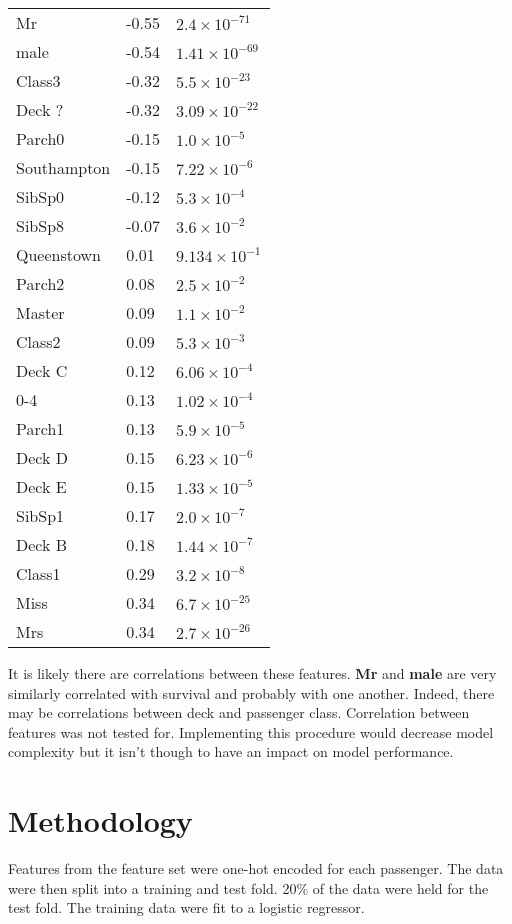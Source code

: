 \documentclass[10pt]{article}
\begin{document}
\begin{multicols}{2}
\begin{tabular}{l l l}
		Mr & -0.55 & $2.4\times10^{-71}$ \\
		male & -0.54 & $1.41\times10^{-69}$ \\
		Class3 & -0.32 & $5.5\times10^{-23}$ \\
		Deck ? & -0.32 & $3.09\times10^{-22}$ \\
		Parch0 & -0.15 & $1.0\times10^{-5}$ \\
		Southampton & -0.15 & $7.22\times10^{-6}$ \\
		SibSp0 & -0.12 & $5.3\times10^{-4}$ \\
		SibSp8 & -0.07 & $3.6\times10^{-2}$ \\
		Queenstown & 0.01 & $9.134\times10^{-1}$ \\
		Parch2 & 0.08 & $2.5\times10^{-2}$ \\
		Master & 0.09 & $1.1\times10^{-2}$ \\
		Class2 & 0.09 & $5.3\times10^{-3}$ \\
		Deck C & 0.12  & $6.06\times10^{-4}$ \\
		0-4 & 0.13 & $1.02\times10^{-4}$ \\
		Parch1 & 0.13 & $5.9\times10^{-5}$ \\
		Deck D & 0.15 & $6.23\times10^{-6}$ \\
		Deck E & 0.15 & $1.33\times10^{-5}$ \\
		SibSp1 & 0.17 & $2.0\times10^{-7}$ \\
		Deck B & 0.18 & $1.44\times10^{-7}$ \\
		Class1 & 0.29 & $3.2\times10^{-8}$ \\
		Miss & 0.34 & $6.7\times10^{-25}$ \\
		Mrs & 0.34 & $2.7\times10^{-26}$ \\

	\end{tabular}

	It is likely there are correlations between these features.
	\textbf{Mr} and \textbf{male} are very similarly correlated with survival and probably with one another.
	Indeed, there may be correlations between deck and passenger class.
	Correlation between features was not tested for.
	Implementing this procedure would decrease model complexity but it isn't though to have an impact on model performance.

\section{Methodology}

	Features from the feature set were one-hot encoded for each passenger.
	The data were then split into a training and test fold.
	20\% of the data were held for the test fold.
	The training data were fit to a logistic regressor.


\end{multicols}
\end{document}
